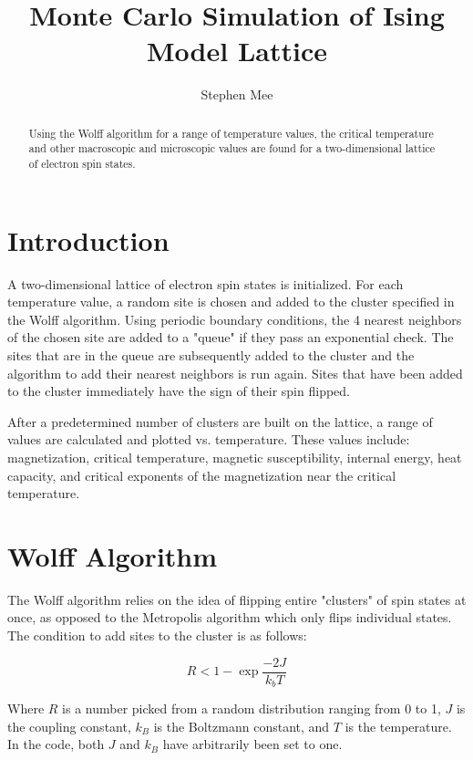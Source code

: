 \documentclass[10pt,letterpaper]{article}
\title{Monte Carlo Simulation of Ising Model Lattice}
\author{Stephen Mee}
\begin{document}
\maketitle

\begin{abstract}

Using the Wolff algorithm for a range of temperature values, the critical temperature and other macroscopic and microscopic values are found for a two-dimensional lattice of electron spin states.

\end{abstract}

\section{Introduction}

A two-dimensional lattice of electron spin states is initialized. For each temperature value, a random site is chosen and added to the cluster specified in the Wolff algorithm. Using periodic boundary conditions, the 4 nearest neighbors of the chosen site are added to a "queue" if they pass an exponential check. The sites that are in the queue are subsequently added to the cluster and the algorithm to add their nearest neighbors is run again. Sites that have been added to the cluster immediately have the sign of their spin flipped.

After a predetermined number of clusters are built on the lattice, a range of values are calculated and plotted vs. temperature. These values include: magnetization, critical temperature, magnetic susceptibility, internal energy, heat capacity, and critical exponents of the magnetization near the critical temperature.

\section{Wolff Algorithm}

The Wolff algorithm relies on the idea of flipping entire "clusters" of spin states at once, as opposed to the Metropolis algorithm which only flips individual states. The condition to add sites to the cluster is as follows:

\begin{equation}
R < 1 - \exp\frac{-2J}{k_{b}T}
\end{equation}

Where $R$ is a number picked from a random distribution ranging from 0 to 1, $J$ is the coupling constant, $k_{B}$ is the Boltzmann constant, and $T$ is the temperature. In the code, both $J$ and $k_{B}$ have arbitrarily been set to one.
\end{document}
